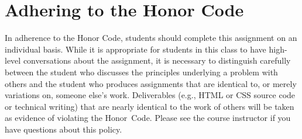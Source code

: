 \documentclass[11pt]{article}
\begin{document}
\section*{Adhering to the Honor Code}

In adherence to the Honor Code, students should complete this assignment on an
individual basis. While it is appropriate for students in this class to have
high-level conversations about the assignment, it is necessary to distinguish
carefully between the student who discusses the principles underlying a problem
with others and the student who produces assignments that are identical to, or
merely variations on, someone else's work. Deliverables (e.g., HTML or CSS
source code or technical writing) that are nearly identical to the work of
others will be taken as evidence of violating the \mbox{Honor Code}. Please see
the course instructor if you have questions about this policy.
\end{document}
